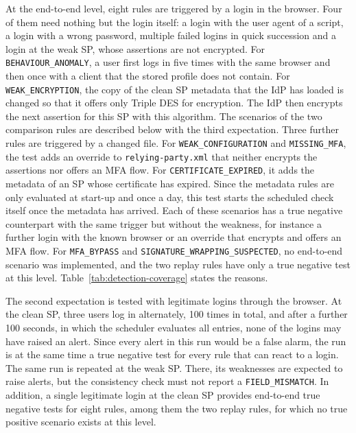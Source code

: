 \documentclass[../main.tex]{subfiles}
\begin{document}
At the end-to-end level, eight rules are triggered by a login in the browser. 
Four of them need nothing but the login itself: a login with the user agent of a script, a login 
with a wrong password, multiple failed logins in quick succession and a login at the weak SP, whose 
assertions are not encrypted. 
For \texttt{BEHAVIOUR\_\allowbreak{}ANOMALY}, a user first logs in five times with the same browser 
and then once with a client that the stored profile does not contain. 
For \texttt{WEAK\_\allowbreak{}ENCRYPTION}, the copy of the clean SP metadata that the IdP has loaded 
is changed so that it offers only Triple DES for encryption. 
The IdP then encrypts the next assertion for this SP with this algorithm. 
The scenarios of the two comparison rules are described below with the third expectation. 
Three further rules are triggered by a changed file. 
For \texttt{WEAK\_\allowbreak{}CONFIGURATION} and \texttt{MISSING\_\allowbreak{}MFA}, the test adds an 
override to \texttt{relying-party.xml} that neither encrypts the assertions nor offers an MFA flow. 
For \texttt{CERTIFICATE\_\allowbreak{}EXPIRED}, it adds the metadata of an SP whose certificate has 
expired. 
Since the metadata rules are only evaluated at start-up and once a day, this test starts the 
scheduled check itself once the metadata has arrived. 
Each of these scenarios has a true negative counterpart with the same trigger but without the 
weakness, for instance a further login with the known browser or an override that encrypts and 
offers an MFA flow. 
For \texttt{MFA\_\allowbreak{}BYPASS} and \texttt{SIGNATURE\_\allowbreak{}WRAPPING\_\allowbreak{}SUSPECTED}, 
no end-to-end scenario was implemented, and the two replay rules have only a true negative test at 
this level. 
Table~\ref{tab:detection-coverage} states the reasons.

The second expectation is tested with legitimate logins through the browser. 
At the clean SP, three users log in alternately, 100 times in total, and after a further 
100 seconds, in which the scheduler evaluates all entries, none of the logins may have raised an alert. 
Since every alert in this run would be a false alarm, the run is at the same time a true negative 
test for every rule that can react to a login. 
The same run is repeated at the weak SP. 
There, its weaknesses are expected to raise alerts, but the consistency check must not report a 
\texttt{FIELD\_\allowbreak{}MISMATCH}. 
In addition, a single legitimate login at the clean SP provides end-to-end true negative tests for eight 
rules, among them the two replay rules, for which no true positive scenario exists at this level. 
\end{document}
